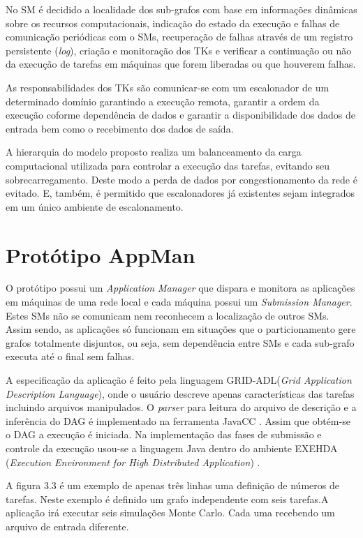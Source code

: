 No SM é decidido a localidade dos sub-grafos com base em informações dinâmicas sobre os recursos computacionais, indicação do estado da execução e falhas de comunicação periódicas com o SMs, recuperação de falhas através de um registro persistente (\emph{log}), criação e monitoração dos TKs e verificar a continuação ou não da execução de tarefas em máquinas que forem liberadas ou que houverem falhas.

As responsabilidades dos TKs são comunicar-se com um escalonador de um determinado domínio garantindo a execução remota, garantir a ordem da execução coforme dependência de dados e garantir a disponibilidade dos dados de entrada bem como o recebimento dos dados de saída.

A hierarquia do modelo proposto realiza um balanceamento da carga computacional utilizada para controlar a execução das tarefas, evitando seu sobrecarregamento. Deste modo a perda de dados por congestionamento da rede é evitado. E, também, é permitido que escalonadores já existentes sejam integrados em um único ambiente de escalonamento.

\section{Protótipo AppMan}

O protótipo possui um \emph{Application Manager} que dispara e monitora as aplicações em máquinas de uma rede local e cada máquina possui um \emph{Submission Manager}. Estes SMs não se comunicam nem reconhecem a localização de outros SMs. Assim sendo, as aplicações só funcionam em situações que o particionamento gere grafos totalmente disjuntos, ou seja, sem dependência entre SMs e cada sub-grafo executa até o final sem falhas.

A especificação da aplicação é feito pela linguagem GRID-ADL(\emph{Grid Application Description Language}), onde o usuário descreve apenas características das tarefas incluindo arquivos manipulados. O \emph{parser} para leitura do arquivo de descrição e a inferência do DAG é implementado na ferramenta JavaCC \cite{javacc}. Assim que obtém-se o DAG a execução é iniciada. Na implementação das fases de submissão e controle da execução usou-se a linguagem Java dentro do ambiente EXEHDA (\emph{Execution Environment for High Distributed Application}) \cite{exehda}.

A figura 3.3 é um exemplo de apenas três linhas uma definição de números de tarefas. Neste exemplo é definido um grafo independente com seis tarefas.A aplicação irá executar seis simulações Monte Carlo. Cada uma recebendo um arquivo de entrada diferente.

